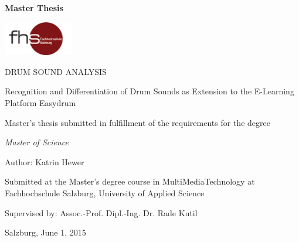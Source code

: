 \begin{titlepage}

\begin{center}
\Huge{ 
	\textbf{Master Thesis}
}
\end{center}

\newpage

\thispagestyle{empty}

\hfill \includegraphics[height=1.5cm]{images/FHSLogo.png}

\vspace*{2cm}

\Large{
DRUM SOUND ANALYSIS

Recognition and Differentiation of Drum Sounds as Extension to the E-Learning Platform Easydrum

\vspace*{1cm}

Master's thesis submitted in fulfillment of the requirements for the degree
\vspace*{0.5cm}

\textit{Master of Science}
}


\vspace*{1.5cm}
{\large
Author: Katrin Hewer
}
\vfill

{\normalsize
Submitted at the Master's degree course in MultiMediaTechnology at Fachhochschule Salzburg, University of Applied Science

\vspace*{1cm}

Supervised by:
Assoc.-Prof. Dipl.-Ing. Dr. Rade Kutil

\vfill

Salzburg, June 1, 2015
}
\end{titlepage}
